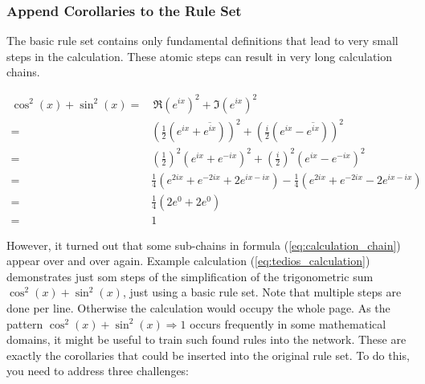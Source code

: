 \documentclass{scrartcl}
\theoremstyle{definition}
\begin{document}
\subsubsection{Append Corollaries to the Rule Set}

The basic rule set contains only fundamental definitions that lead to very small steps in the calculation.
These atomic steps can result in very long calculation chains.%

\begin{equation}
	\label{eq:tedios_calculation}
	\begin{aligned}
		\cos^2(x)+\sin^2(x) = &\, \Re\left(e^{ix}\right)^2+\Im\left(e^{ix}\right)^2 \\
		= & \left(\frac{1}{2} \left(e^{ix}+\overline{e^{ix}}\right)\right)^2 + \left(\frac{i}{2} \left(e^{ix}-\overline{e^{ix}}\right)\right)^2 \\
		= & \left(\frac{1}{2}\right)^2 \left(e^{ix}+e^{-ix}\right)^2 + \left(\frac{i}{2}\right)^2 \left(e^{ix}-e^{-ix}\right)^2 \\
		= & \frac{1}{4} \left(e^{2ix}+e^{-2ix}+2e^{ix-ix}\right) - \frac{1}{4} \left(e^{2ix}+e^{-2ix}-2e^{ix-ix}\right) \\
		= & \frac{1}{4} \left( 2e^0+2e^0 \right) \\
		= & 1
	\end{aligned}
\end{equation}

However, it turned out that some sub-chains in formula (\ref{eq:calculation_chain}) appear over and over again.
Example calculation (\ref{eq:tedios_calculation}) demonstrates just som steps of the simplification of the trigonometric sum $\cos^2(x)+\sin^2(x)$, just using a basic rule set.
Note that multiple steps are done per line. Otherwise the calculation would occupy the whole page.
As the pattern $\cos^2(x)+\sin^2(x) \Longrightarrow 1$ occurs frequently in some mathematical domains, it might be useful to train such found rules into the network.   
These are exactly the corollaries that could be inserted into the original rule set.
To do this, you need to address three challenges:
\end{document}
